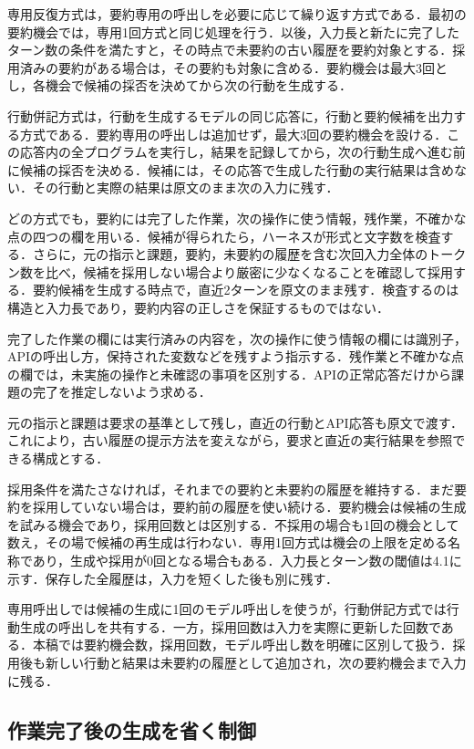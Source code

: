 \documentclass[letter]{ieicej}
\begin{document}
専用反復方式は，要約専用の呼出しを必要に応じて繰り返す方式である．最初の要約機会では，専用1回方式と同じ処理を行う．以後，入力長と新たに完了したターン数の条件を満たすと，その時点で未要約の古い履歴を要約対象とする．採用済みの要約がある場合は，その要約も対象に含める．要約機会は最大3回とし，各機会で候補の採否を決めてから次の行動を生成する．

行動併記方式は，行動を生成するモデルの同じ応答に，行動と要約候補を出力する方式である．要約専用の呼出しは追加せず，最大3回の要約機会を設ける．この応答内の全プログラムを実行し，結果を記録してから，次の行動生成へ進む前に候補の採否を決める．候補には，その応答で生成した行動の実行結果は含めない．その行動と実際の結果は原文のまま次の入力に残す．

どの方式でも，要約には完了した作業，次の操作に使う情報，残作業，不確かな点の四つの欄を用いる．候補が得られたら，ハーネスが形式と文字数を検査する．さらに，元の指示と課題，要約，未要約の履歴を含む次回入力全体のトークン数を比べ，候補を採用しない場合より厳密に少なくなることを確認して採用する．要約候補を生成する時点で，直近2ターンを原文のまま残す．検査するのは構造と入力長であり，要約内容の正しさを保証するものではない．

完了した作業の欄には実行済みの内容を，次の操作に使う情報の欄には識別子，APIの呼出し方，保持された変数などを残すよう指示する．残作業と不確かな点の欄では，未実施の操作と未確認の事項を区別する．APIの正常応答だけから課題の完了を推定しないよう求める．

元の指示と課題は要求の基準として残し，直近の行動とAPI応答も原文で渡す．これにより，古い履歴の提示方法を変えながら，要求と直近の実行結果を参照できる構成とする．

採用条件を満たさなければ，それまでの要約と未要約の履歴を維持する．まだ要約を採用していない場合は，要約前の履歴を使い続ける．要約機会は候補の生成を試みる機会であり，採用回数とは区別する．不採用の場合も1回の機会として数え，その場で候補の再生成は行わない．専用1回方式は機会の上限を定める名称であり，生成や採用が0回となる場合もある．入力長とターン数の閾値は4.1に示す．保存した全履歴は，入力を短くした後も別に残す．

専用呼出しでは候補の生成に1回のモデル呼出しを使うが，行動併記方式では行動生成の呼出しを共有する．一方，採用回数は入力を実際に更新した回数である．本稿では要約機会数，採用回数，モデル呼出し数を明確に区別して扱う．採用後も新しい行動と結果は未要約の履歴として追加され，次の要約機会まで入力に残る．

\subsection{作業完了後の生成を省く制御}
\end{document}
